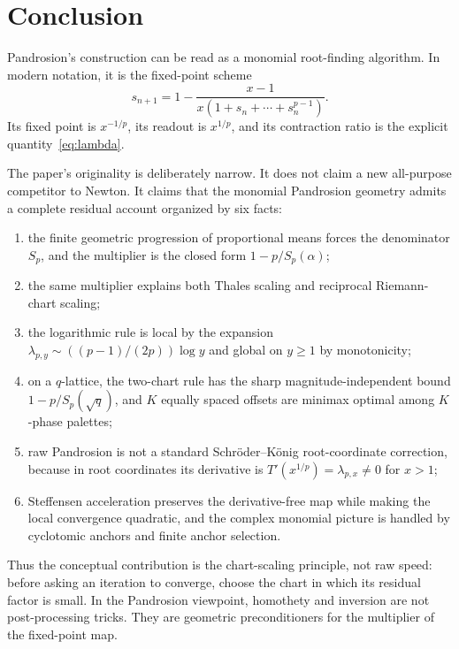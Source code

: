 \documentclass[10pt,a4paper]{article}
\theoremstyle{plain}
\theoremstyle{definition}
\theoremstyle{remark}
\begin{document}
\section{Conclusion}
\label{sec:conclusion}

Pandrosion's construction can be read as a monomial root-finding algorithm.  In
modern notation, it is the fixed-point scheme
\[
  s_{n+1}=1-\frac{x-1}{x(1+s_n+\cdots+s_n^{p-1})}.
\]
Its fixed point is $x^{-1/p}$, its readout is $x^{1/p}$, and its contraction
ratio is the explicit quantity~\eqref{eq:lambda}.

The paper's originality is deliberately narrow.  It does not claim a new
all-purpose competitor to Newton.  It claims that the monomial Pandrosion
geometry admits a complete residual account organized by six facts:
\begin{enumerate}
  \item the finite geometric progression of proportional means forces the
  denominator $S_p$, and the multiplier is the closed form
  $1-p/S_p(\alpha)$;
  \item the same multiplier explains both Thales scaling and reciprocal
  Riemann-chart scaling;
  \item the logarithmic rule is local by the expansion
  $\lambda_{p,y}\sim ((p-1)/(2p))\log y$ and global on $y\ge1$ by
  monotonicity;
  \item on a $q$-lattice, the two-chart rule has the sharp
  magnitude-independent bound $1-p/S_p(\sqrt q)$, and $K$ equally spaced
  offsets are minimax optimal among $K$-phase palettes;
  \item raw Pandrosion is not a standard Schröder--König root-coordinate
  correction, because in root coordinates its derivative is
  $T'(x^{1/p})=\lambda_{p,x}\ne0$ for $x>1$;
  \item Steffensen acceleration preserves the derivative-free map while making
  the local convergence quadratic, and the complex monomial picture is handled
  by cyclotomic anchors and finite anchor selection.
\end{enumerate}

Thus the conceptual contribution is the chart-scaling principle, not raw speed:
before asking an iteration to converge, choose the chart in which its residual
factor is small.  In the Pandrosion viewpoint, homothety and inversion are not
post-processing tricks.  They are geometric preconditioners for the multiplier
of the fixed-point map.
\end{document}
